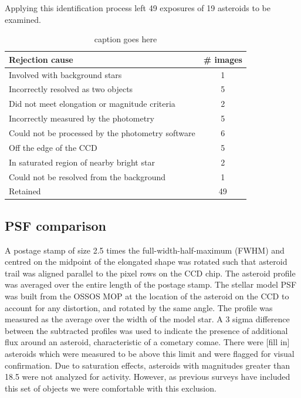 \documentclass[iop,apj]{emulateapj}
\begin{document}
Applying this identification process left 49 exposures of 19 asteroids to be examined.

\begin{table}[htdp]
\caption{caption goes here}
\begin{center}
\begin{tabular}{lc}
	\textbf{Rejection cause}								& 	\textbf{\# images} \\
	\hline
	Involved with background stars                                     	& 	1			\\
	Incorrectly resolved as two objects					& 	5			\\
	Did not meet elongation or magnitude criteria			& 	2			\\
	Incorrectly measured by the photometry				& 	5			\\
	Could not be processed by the photometry software	& 	6			\\
	Off the edge of the CCD								& 	5			\\
	In saturated region of nearby bright star				& 	2			\\
	Could not be resolved from the background 			&	1			\\
	\hline
	Retained											& 49       
\end{tabular}
\end{center}
\label{default}
\end{table}

\subsection{PSF comparison}

A postage stamp of size 2.5 times the full-width-half-maximum (FWHM) and centred on the midpoint of the elongated shape was rotated such that asteroid trail was aligned parallel to the pixel rows on the CCD chip. The asteroid profile was averaged over the entire length of the postage stamp. The stellar model PSF was built from the OSSOS MOP at the location of the asteroid on the CCD to account for any distortion, and rotated by the same angle.  The profile was measured as the average over the width of the model star. A 3 sigma difference between the subtracted profiles was used to indicate the presence of additional flux around an asteroid, characteristic of a cometary comae. There were [fill in] asteroids which were measured to be above this limit and were flagged for visual confirmation. Due to saturation effects, asteroids with magnitudes greater than 18.5 were not analyzed for activity. However, as previous surveys have included this set of objects \citep{hsieh15} we were comfortable with this exclusion.
\end{document}

